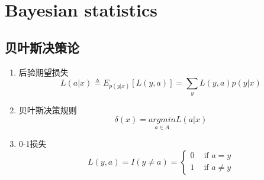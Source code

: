 \chapter{Bayesian statistics}

\section{贝叶斯决策论}
\begin{enumerate}
\item 后验期望损失
\begin{equation}
L(a|x) \triangleq E_{p(y|x)}[L(y,a)] = \sum_yL(y,a)p(y|x)
\end{equation}
\item 贝叶斯决策规则
\begin{equation}
\delta(x) = \underset{a\in A}{argmin}L(a|x)
\end{equation}
\item 0-1损失
\begin{equation}
L(y,a) = I(y \neq a) = 
\begin{cases}
0 & \text{ if } a = y\\ 
1 & \text{ if } a \neq y
\end{cases}
\end{equation}
\end{enumerate}
